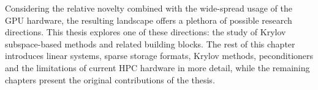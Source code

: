 Considering the relative novelty combined with the wide-spread usage of the
GPU hardware, the resulting landscape offers a plethora of possible research
directions. This thesis explores one of these directions: the study of Krylov
subspace-based methods and related building blocks. The rest of this chapter
introduces linear systems, sparse storage formats, Krylov methods,
peconditioners and the limitations of current HPC hardware in more detail, while
the remaining chapters present the original contributions of the thesis.
